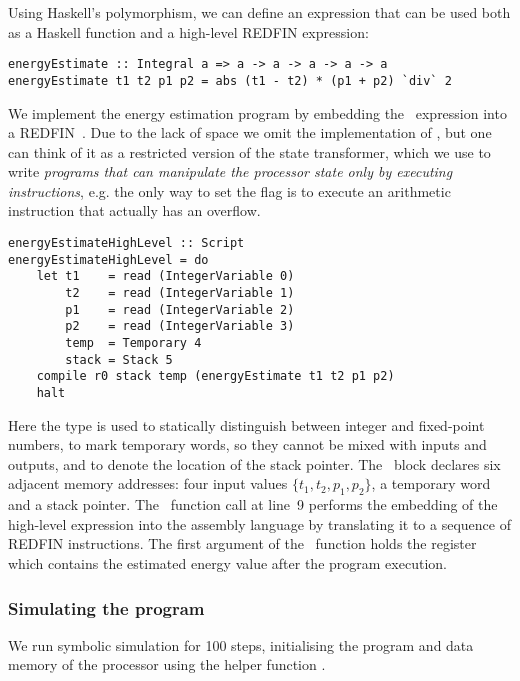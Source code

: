 Using Haskell's polymorphism, we can define an expression that can
be used both as a Haskell function and a high-level REDFIN expression:


\begin{verbatim}
energyEstimate :: Integral a => a -> a -> a -> a -> a
energyEstimate t1 t2 p1 p2 = abs (t1 - t2) * (p1 + p2) `div` 2
\end{verbatim}


\noindent
We implement the energy estimation program by embedding the~
expression into a REDFIN~. Due to the lack of space we omit the
implementation of , but one can think of it as a restricted version
of the  state transformer, which we use to write \emph{programs that
can manipulate the processor state only by executing instructions}, e.g. the
only way to set the  flag is to execute an arithmetic instruction
that actually has an overflow.


\begin{verbatim}
energyEstimateHighLevel :: Script
energyEstimateHighLevel = do
    let t1    = read (IntegerVariable 0)
        t2    = read (IntegerVariable 1)
        p1    = read (IntegerVariable 2)
        p2    = read (IntegerVariable 3)
        temp  = Temporary 4
        stack = Stack 5
    compile r0 stack temp (energyEstimate t1 t2 p1 p2)
    halt
\end{verbatim}
\label{energyEstimateHighLevel}


\noindent
Here the type  is used to statically distinguish between integer
and fixed-point numbers,  to mark temporary words, so they cannot
be mixed with inputs and outputs, and  to denote the location of the
stack pointer. The~ block declares six adjacent memory addresses: four
input values $\{t_1, t_2, p_1, p_2\}$, a temporary word and a stack pointer.
The~ function call at line~9 performs the embedding of the high-level
 expression into the assembly language by translating it to a
sequence of REDFIN instructions. The first argument of the~ function
holds the register~ which contains the estimated energy value after the
program execution.


\subsubsection{Simulating the program}
We run symbolic simulation for 100 steps, initialising the program and data
memory of the processor using the helper function .

